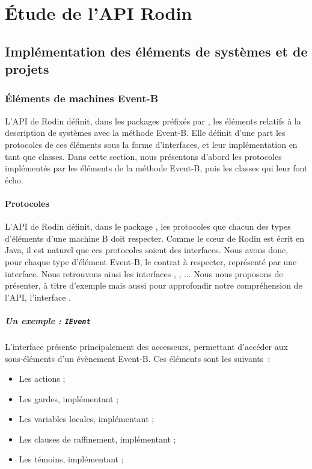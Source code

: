 \chapter{Étude de l'API Rodin}

\section{Implémentation des éléments de systèmes et de projets}

\subsection{Éléments de machines Event-B}

L'API de Rodin définit, dans les packages préfixés par , les éléments relatifs à la description de systèmes %
avec la méthode Event-B.
Elle définit d'une part les protocoles de ces éléments sous la forme d'interfaces, et leur implémentation en tant que classes.
Dans cette section, nous présentons d'abord les protocoles implémentés par les éléments de la méthode Event-B, puis les classes qui leur font écho.

\subsubsection{Protocoles}

L'API de Rodin définit, dans le package , les protocoles que chacun des types d'éléments %
d'une machine B doit respecter.
Comme le cœur de Rodin est écrit en Java, il est naturel que ces protocoles soient des interfaces.
Nous avons donc, pour chaque type d'élément Event-B, le contrat à respecter, représenté par une interface.
Nous retrouvons ainsi les interfaces , , ...
Nous nous proposons de présenter, à titre d'exemple mais aussi pour approfondir notre compréhension de l'API, l'interface .

\paragraph{Un exemple : \texttt{IEvent}}

L'interface  présente principalement des accesseurs, permettant d'accéder aux sous-éléments d'un évènement Event-B.
Ces éléments sont les suivants~:

\begin{itemize}
    \item Les actions ;
    \item Les gardes, implémentant ;
    \item Les variables locales, implémentant ;
    \item Les clauses de raffinement, implémentant ;
    \item Les témoins, implémentant ;
\end{itemize}

